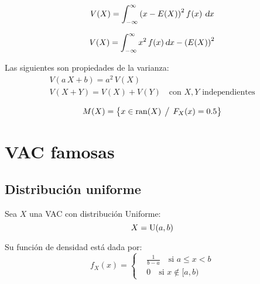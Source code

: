 \begin{mdframed}[style=DefinitionFrame]
    \begin{defn}
    \end{defn}
    \begin{equation*}
        V(X) = \int_{-\infty}^{\infty} \left(x - E(X)\right)^2 f \hspace{-0.5mm} \left( x \right) \, \textsl{d} x
    \end{equation*}
\end{mdframed}

\begin{mdframed}[style=PropertyFrame]
    \begin{prop}
    \end{prop}
    \begin{equation*}
        V(X) = \int_{-\infty}^{\infty} x^2 \, f(x) \, \textsl{d} x - \left(E(X)\right)^2
    \end{equation*}
\end{mdframed}

Las siguientes son propiedades de la varianza:
\begin{gather*}
    V(a \, X+b) = a^2 \, V(X)
    \\
    V(X+Y) = V(X) + V(Y) \quad \text{con $X, Y$ independientes}
\end{gather*}

\begin{mdframed}[style=DefinitionFrame]
    \begin{defn}
    \end{defn}
    \begin{equation*}
        M(X) = { \left\{ {x \in \operatorname{ran}(X) \hspace{1ex} \big/ \hspace{1ex} F_X(x) = 0.5} \right\} }
    \end{equation*}
\end{mdframed}


\section{VAC famosas}


\subsection{Distribución uniforme}

Sea $X$ una VAC con distribución Uniforme:
\begin{equation*}
    X = \operatorname{U}(a,b)
\end{equation*}

Su función de densidad está dada por:
\begin{equation*}
    f_X(x) =
    \left\{
    \begin{aligned}
        & \frac{1}{b-a} \quad \text{si } a \leq x < b
        \\[1ex]
        & 0 \quad \text{si } x \notin [a,b)
    \end{aligned}
    \right.
\end{equation*}

